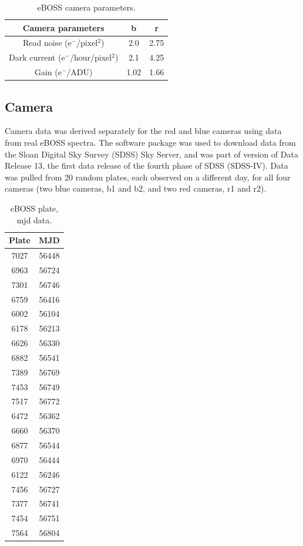 \begin{table}[h]
\caption{eBOSS camera parameters.}
\label{tab:ebosscam}
\centering
\begin{tabular}{|c|c|c|}
  \hline
  Camera parameters & b & r\\
  \hline \hline
  Read noise (e$^{-}$/pixel$^{2}$) & 2.0 & 2.75 \\
  \hline
  Dark current (e$^{-}$/hour/pixel$^{2}$) & 2.1 & 4.25 \\
  \hline
  Gain (e$^{-}$/ADU) & 1.02 & 1.66\\
  \hline
\end{tabular}
\end{table}

\subsection{Camera}

Camera data was derived separately for the red and blue cameras using data from real eBOSS spectra. The  software package \cite{xx} was used to download data from the Sloan Digital Sky Survey (SDSS) Sky Server, and was part of version  of Data Release 13, the first data release of the fourth phase of SDSS (SDSS-IV). Data was pulled from 20 random plates, each observed on a different day, for all four cameras (two blue cameras, b1 and b2, and two red cameras, r1 and r2). 

\begin{table}[h]
\caption{eBOSS plate, mjd data.}
\label{tab:eboss_plates}
\centering
\begin{tabular}{|c|c|}
\hline
  Plate & MJD \\
  \hline \hline
  7027 & 56448 \\
  \hline
  6963 & 56724 \\
  \hline
  7301 & 56746 \\
  \hline
  6759 & 56416 \\
  \hline
  6002 & 56104 \\
  \hline
  6178 & 56213 \\
  \hline
  6626 & 56330 \\
  \hline
  6882 & 56541 \\
  \hline
  7389 & 56769 \\
  \hline
  7453 & 56749 \\
  \hline
  7517 & 56772 \\
  \hline
  6472 & 56362 \\
  \hline
  6660 & 56370 \\
  \hline
  6877 & 56544 \\
  \hline
  6970 & 56444 \\
  \hline
  6122 & 56246 \\
  \hline
  7456 & 56727 \\
  \hline
  7377 & 56741 \\
  \hline
  7454 & 56751 \\
  \hline
  7564 & 56804 \\
  \hline
\end{tabular}
\end{table}

